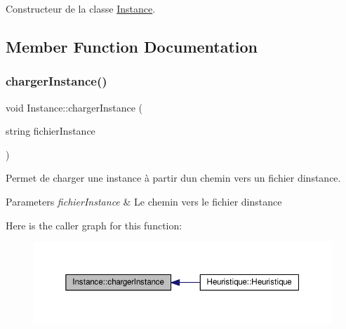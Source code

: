 Constructeur de la classe \hyperlink{classInstance}{Instance}. 



\subsection{Member Function Documentation}
\mbox{\label{classInstance_aa64eca6a12ffa8ffc850ac4e04f268fb}} 
\subsubsection{\texorpdfstring{charger\+Instance()}{chargerInstance()}}
{\footnotesize\ttfamily void Instance\+::charger\+Instance (\begin{DoxyParamCaption}\item[{string}]{fichier\+Instance }\end{DoxyParamCaption})}



Permet de charger une instance à partir d\textquotesingle{}un chemin vers un fichier d\textquotesingle{}instance. 


\begin{DoxyParams}{Parameters}
{\em fichier\+Instance} & Le chemin vers le fichier d\textquotesingle{}instance \\
\hline
\end{DoxyParams}
Here is the caller graph for this function\+:\nopagebreak
\begin{figure}[H]
\begin{center}
\leavevmode
\includegraphics[width=350pt]{classInstance_aa64eca6a12ffa8ffc850ac4e04f268fb_icgraph}
\end{center}
\end{figure}
\mbox{\label{classInstance_a5dac330671540cf94e87b7586cd3102e}} 
